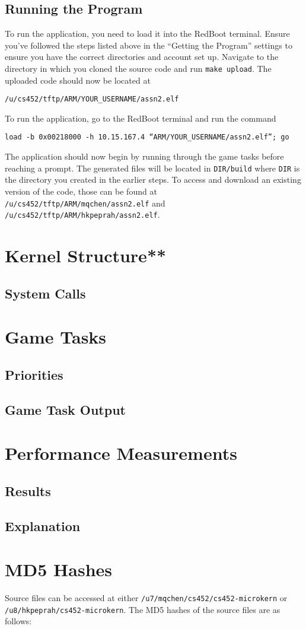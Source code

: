 \documentclass[12pt]{article}
\begin{document}
\subsection{Running the Program}
To run the application, you need to load it into the RedBoot terminal.  Ensure you've followed the steps listed above in the ``Getting the Program'' settings to ensure you have the correct directories and account set up.  Navigate to the directory in which you cloned the source code and run \texttt{make upload}.  The uploaded code should now be located at
\begin{center}
  \texttt{/u/cs452/tftp/ARM/YOUR\_USERNAME/assn2.elf}
\end{center}
To run the application, go to the RedBoot terminal and run the command
\begin{center}
  \texttt{load -b 0x00218000 -h 10.15.167.4 ``ARM/YOUR\_USERNAME/assn2.elf''; go}
\end{center}
The application should now begin by running through the game tasks before reaching a prompt.  The generated files will be located in \texttt{DIR/build} where \texttt{DIR} is the directory you created in the earlier steps.  To access and download an existing version of the code, those can be found at \texttt{/u/cs452/tftp/ARM/mqchen/assn2.elf} and \texttt{/u/cs452/tftp/ARM/hkpeprah/assn2.elf}.
\\[2\baselineskip]

\section{Kernel Structure**}
\subsection{System Calls}
\section{Game Tasks}
\subsection{Priorities}
\subsection{Game Task Output}
\section{Performance Measurements}
\subsection{Results}
\subsection{Explanation}
\section{MD5 Hashes}
Source files can be accessed at either \texttt{/u7/mqchen/cs452/cs452-microkern} or \\ \texttt{/u8/hkpeprah/cs452-microkern}. The MD5 hashes of the source files are as follows:\\
% 
\end{document}
